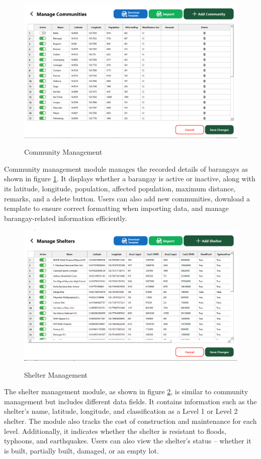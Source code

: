 \documentclass[12pt,a4paper,]{article}
\begin{document}
	\begin{figure}[h!]
		\caption{Community Management}
		\centering
		\includegraphics[width=\columnwidth]{Chapter 4/commadvanced}
		\label{commMan}
	\end{figure}
	Community management module manages the recorded details of barangays as shown in figure \ref{commMan}. It displays whether a barangay is active or inactive, along with its latitude, longitude, population, affected population, maximum distance, remarks, and a delete button. Users can also add new communities, download a template to ensure correct formatting when importing data, and manage barangay-related information efficiently.
	
	\begin{figure}[h!]
		\caption{Shelter Management}
		\centering
		\includegraphics[width=\columnwidth]{Chapter 4/sheladvanced}
		\label{shelMan}
	\end{figure}
	The shelter management module, as shown in figure \ref{shelMan}, is similar to community management but includes different data fields. It contains information such as the shelter’s name, latitude, longitude, and classification as a Level 1 or Level 2 shelter. The module also tracks the cost of construction and maintenance for each level. Additionally, it indicates whether the shelter is resistant to floods, typhoons, and earthquakes. Users can also view the shelter’s status – whether it is built, partially built, damaged, or an empty lot.
	
\end{document}
